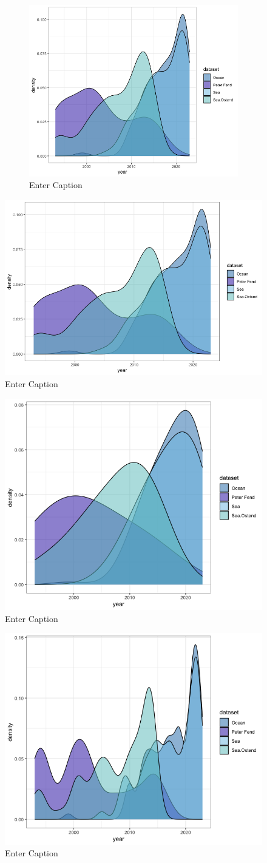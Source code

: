 \documentclass[a4paper, twoside, 12pt]{book}
\begin{document}
\begin{figure}
\begin{figure}
        \centering
        \includegraphics[width=0.5\linewidth]{density all adjust 1.png}
        \caption{Enter Caption}
        \label{fig:enter-label}
    \end{figure}
    \centering
    \includegraphics[width=0.5\linewidth]{density all 1993 adjust 1.png}
    \caption{Enter Caption}
    \label{fig:enter-label}
\end{figure}

\begin{figure}
    \centering
    \includegraphics[width=0.5\linewidth]{density all adjust 2.png}
    \caption{Enter Caption}
    \label{fig:enter-label}
\end{figure}
\begin{figure}
    \centering
    \includegraphics[width=0.5\linewidth]{density all from 1993 adjust 0 5.png}
    \caption{Enter Caption}
    \label{fig:enter-label}
\end{figure}
\end{document}
